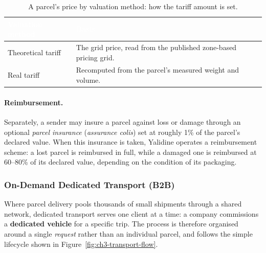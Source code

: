 \begin{table}[H]
\centering
\caption{A parcel's price by valuation method: how the tariff amount is set.}
\label{tab:ch3-pricing-valuation}
\renewcommand{\arraystretch}{1.35}
\begin{tabularx}{\linewidth}{|>{\raggedright\arraybackslash}p{3.7cm}|>{\raggedright\arraybackslash}X|}
\hline
\rowcolor{tblheader}
\textcolor{white}{\textbf{Valuation method}} & \textcolor{white}{\textbf{Basis}} \\
\hline
Theoretical tariff & The grid price, read from the published zone-based pricing grid. \\
Real tariff & Recomputed from the parcel's measured weight and volume. \\
\hline
\end{tabularx}
\end{table}

\paragraph{Reimbursement.}
Separately, a sender may insure a parcel against loss or damage through an optional \emph{parcel
insurance} (\emph{assurance colis}) set at roughly 1\% of the parcel's declared value. When this
insurance is taken, Yalidine operates a reimbursement scheme: a lost parcel is reimbursed in full,
while a damaged one is reimbursed at 60--80\% of its declared value, depending on the condition of
its packaging.

\subsubsection{On-Demand Dedicated Transport (B2B)}

Where parcel delivery pools thousands of small shipments through a shared network, dedicated
transport serves one client at a time: a company commissions a \textbf{dedicated vehicle} for a
specific trip. The process is therefore organised around a single \emph{request} rather than an
individual parcel, and follows the simple lifecycle shown in Figure~\ref{fig:ch3-transport-flow}.


